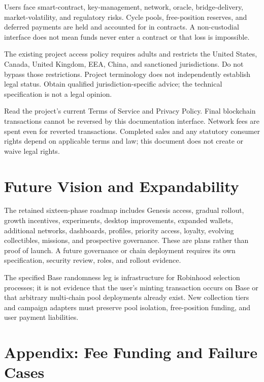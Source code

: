 \documentclass[
  10pt,
  letterpaper,
]{article}
\begin{document}
Users face smart-contract, key-management, network, oracle,
bridge-delivery, market-volatility, and regulatory risks. Cycle pools,
free-position reserves, and deferred payments are held and accounted for
in contracts. A non-custodial interface does not mean funds never enter
a contract or that loss is impossible.

The existing project access policy requires adults and restricts the
United States, Canada, United Kingdom, EEA, China, and sanctioned
jurisdictions. Do not bypass those restrictions. Project terminology
does not independently establish legal status. Obtain qualified
jurisdiction-specific advice; the technical specification is not a legal
opinion.

Read the project's current Terms of Service and Privacy Policy. Final
blockchain transactions cannot be reversed by this documentation
interface. Network fees are spent even for reverted transactions.
Completed sales and any statutory consumer rights depend on applicable
terms and law; this document does not create or waive legal rights.

\section{Future Vision and
Expandability}\label{future-vision-and-expandability}

The retained sixteen-phase roadmap includes Genesis access, gradual
rollout, growth incentives, experiments, desktop improvements, expanded
wallets, additional networks, dashboards, profiles, priority access,
loyalty, evolving collectibles, missions, and prospective governance.
These are plans rather than proof of launch. A future governance or
chain deployment requires its own specification, security review, roles,
and rollout evidence.

The specified Base randomness leg is infrastructure for Robinhood
selection processes; it is not evidence that the user's minting
transaction occurs on Base or that arbitrary multi-chain pool
deployments already exist. New collection tiers and campaign adapters
must preserve pool isolation, free-position funding, and user payment
liabilities.

\section{Appendix: Fee Funding and Failure
Cases}\label{appendix-fee-funding-and-failure-cases}
\end{document}

